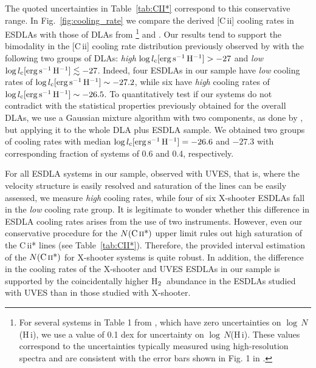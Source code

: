 \documentclass[fleqn,usenatbib,useAMS]{mnras}
\newcommand{\HH}{\mbox{H$\rm _2$}}
\newcommand{\HI}{H\,{\sc i}}
\newcommand{\CII}{C\,{\sc ii}}
\begin{document}
The quoted uncertainties in Table~\ref{tab:CII*} correspond to this conservative range.
In Fig.~\ref{fig:cooling_rate} we compare the derived [\CII] cooling rates in ESDLAs with those of DLAs from \citet{Wolfe2008}\footnote{For several systems in Table 1 from \citet{Wolfe2008}, which have zero uncertainties on $\log\, N$(\HI), we use a value of 0.1 dex for uncertainty on $\log\, N$(\HI). 
These values correspond to the uncertainties typically measured using high-resolution spectra and are consistent with the error bars shown in Fig. 1 in \citet{Wolfe2008}.} and \citet{Dutta2014}. 
Our results tend to support the bimodality in the [\CII] cooling rate distribution previously observed by \citet{Wolfe2008} with the following two groups of DLAs: {\it high} $\log l_{\rm c}[\rm erg\,s^{-1}\,H^{-1}] > -27$ and {\it low} $\log l_{\rm c}[\rm erg\,s^{-1}\,H^{-1}] \lesssim -27$. Indeed, four ESDLAs in our sample have {\it low} cooling rates of $\log l_{\rm c} [\rm erg\,s^{-1}\,H^{-1}] \sim -27.2$, 
while six have {\it high} cooling rates of $\log l_{\rm c}[\rm erg\,s^{-1}\,H^{-1}] \sim -26.5$. To quantitatively test if our systems 
do not contradict with the statistical properties previously obtained for the overall DLAs, we use a Gaussian mixture algorithm with two components, as done by \citet{Wolfe2008}, but applying it to the whole DLA plus ESDLA sample. 
We obtained two groups of cooling rates with median $\log l_{\rm c}[\rm erg\,s^{-1}\,H^{-1}] = -26.6$ and $-27.3$ with corresponding fraction of systems of 0.6 and 0.4, respectively.

For all ESDLA systems in our sample, observed with UVES, that is, where the velocity structure is easily resolved and saturation of the lines can be easily assessed, we measure {\it high} cooling rates, while four of six X-shooter ESDLAs fall in the {\it low} cooling rate group. 
It is legitimate to wonder whether this difference {in ESDLA cooling rates} arises from the use of two instruments. 
However, even our conservative procedure for the $N(\text{\CII*})$ upper limit rules out high saturation of the \CII* lines (see Table~\ref{tab:CII*}). Therefore, the provided interval estimation of the $N(\text{\CII*})$ for X-shooter systems is quite robust. In addition, the difference in the cooling rates of the X-shooter and UVES ESDLAs in our sample is supported by the coincidentally higher \HH\ abundance in the ESDLAs studied with UVES than in those studied with X-shooter.
\end{document}
